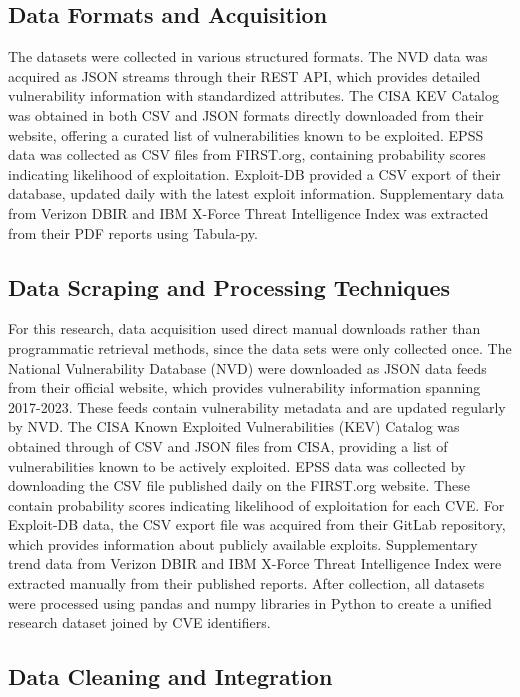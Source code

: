 \documentclass[runningheads]{llncs}
\begin{document}
\subsection{Data Formats and Acquisition}
The datasets were collected in various structured formats. The NVD data was acquired as JSON streams through their REST API, which provides detailed vulnerability information with standardized attributes. The CISA KEV Catalog was obtained in both CSV and JSON formats directly downloaded from their website, offering a curated list of vulnerabilities known to be exploited. EPSS data was collected as CSV files from FIRST.org, containing probability scores indicating likelihood of exploitation. Exploit-DB provided a CSV export of their database, updated daily with the latest exploit information. Supplementary data from Verizon DBIR and IBM X-Force Threat Intelligence Index was extracted from their PDF reports using Tabula-py.

\subsection{Data Scraping and Processing Techniques}
For this research, data acquisition used direct manual downloads rather than  programmatic retrieval methods, since the data sets were only collected once. The National Vulnerability Database (NVD) were downloaded as JSON data feeds from their official website, which provides vulnerability information spanning 2017-2023. These feeds contain vulnerability metadata and are updated regularly by NVD. The CISA Known Exploited Vulnerabilities (KEV) Catalog was obtained through of CSV and JSON files from CISA, providing a list of vulnerabilities known to be actively exploited. EPSS data was collected by downloading the CSV file published daily on the FIRST.org website. These contain probability scores indicating likelihood of exploitation for each CVE. For Exploit-DB data, the CSV export file was acquired from their GitLab repository, which provides  information about publicly available exploits. Supplementary trend data from Verizon DBIR and IBM X-Force Threat Intelligence Index were extracted manually from their published reports. After collection, all datasets were processed using pandas and numpy libraries in Python to create a unified research dataset joined by CVE identifiers.

\subsection{Data Cleaning and Integration}
\end{document}
